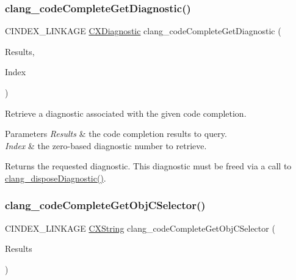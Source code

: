 \subsubsection{\texorpdfstring{clang\+\_\+code\+Complete\+Get\+Diagnostic()}{clang\_codeCompleteGetDiagnostic()}}
{\footnotesize\ttfamily C\+I\+N\+D\+E\+X\+\_\+\+L\+I\+N\+K\+A\+GE \mbox{\hyperlink{group__CINDEX__DIAG_ga44bb8aba7c40590ad25d1763c4fbff7f}{C\+X\+Diagnostic}} clang\+\_\+code\+Complete\+Get\+Diagnostic (\begin{DoxyParamCaption}\item[{\mbox{\hyperlink{structCXCodeCompleteResults}{C\+X\+Code\+Complete\+Results}} $\ast$}]{Results,  }\item[{unsigned}]{Index }\end{DoxyParamCaption})}



Retrieve a diagnostic associated with the given code completion. 


\begin{DoxyParams}{Parameters}
{\em Results} & the code completion results to query. \\
\hline
{\em Index} & the zero-\/based diagnostic number to retrieve.\\
\hline
\end{DoxyParams}
\begin{DoxyReturn}{Returns}
the requested diagnostic. This diagnostic must be freed via a call to {\ttfamily \mbox{\hyperlink{group__CINDEX__DIAG_ga07061e0ad7665b7c5ee7253cd1bf4a5c}{clang\+\_\+dispose\+Diagnostic()}}}. 
\end{DoxyReturn}
\mbox{\label{group__CINDEX__CODE__COMPLET_gad03e82d61a1e6cdb78538bf61823aa11}} 
\subsubsection{\texorpdfstring{clang\+\_\+code\+Complete\+Get\+Obj\+C\+Selector()}{clang\_codeCompleteGetObjCSelector()}}
{\footnotesize\ttfamily C\+I\+N\+D\+E\+X\+\_\+\+L\+I\+N\+K\+A\+GE \mbox{\hyperlink{structCXString}{C\+X\+String}} clang\+\_\+code\+Complete\+Get\+Obj\+C\+Selector (\begin{DoxyParamCaption}\item[{\mbox{\hyperlink{structCXCodeCompleteResults}{C\+X\+Code\+Complete\+Results}} $\ast$}]{Results }\end{DoxyParamCaption})}



